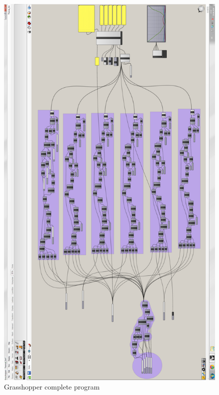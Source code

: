 \begin{figure}[h]
 \centering
 \includegraphics[width=130mm]{graphic/GH_complete.png}
 \caption{Grasshopper complete program}
 \label{GH_complete}
\end{figure}